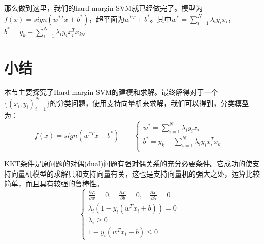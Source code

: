 \documentclass[a4paper]{article}
\begin{document}
那么做到这里，我们的hard-margin SVM就已经做完了。模型为$f(x)=sign(w^{\ast T}x+b^{\ast})$，超平面为$w^{\ast T}+b^{\ast}$。其中$w^\ast = \sum_{i=1}^N \lambda_iy_ix_i$，$b^\ast = y_k - \sum_{i=1}^N \lambda_iy_ix_i^T x_k$。

\section{小结}
本节主要探究了Hard-margin SVM的建模和求解。最终解得对于一个$\{ (x_i,y_i)_{i=1}^N \}$的分类问题，使用支持向量机来求解，我们可以得到，分类模型为：
\begin{equation}
    f(x)=sign(w^{\ast T}x+b^{\ast}) \qquad
    \left\{
    \begin{array}{ll}
         w^\ast = \sum_{i=1}^N \lambda_iy_ix_i & \\
         b^\ast = y_k - \sum_{i=1}^N \lambda_iy_ix_i^T x_k & \\
    \end{array}
    \right.
\end{equation}

KKT条件是原问题的对偶(dual)问题有强对偶关系的充分必要条件。它成功的使支持向量机模型的求解只和支持向量有关，这也是支持向量机的强大之处，运算比较简单，而且具有较强的鲁棒性。
\begin{equation}
    \left\{
    \begin{array}{ll}
          \frac{\partial \mathcal{L}}{\partial w} = 0,\quad
          \frac{\partial \mathcal{L}}{\partial b} = 0,\quad
          \frac{\partial \mathcal{L}}{\partial \lambda} = 0 & \\
          \lambda_i(1-y_i(w^Tx_i+b)) = 0 & \\
          \lambda_i \geq 0 & \\
          1-y_i(w^Tx_i+b) \leq 0 
    \end{array}
    \right.
\end{equation}
\end{document}
